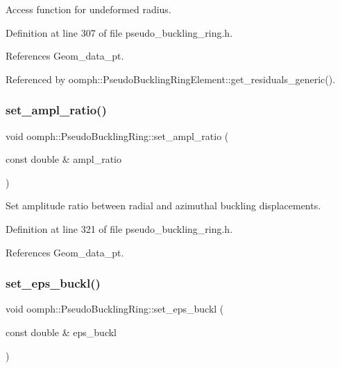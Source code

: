 Access function for undeformed radius. 



Definition at line 307 of file pseudo\+\_\+buckling\+\_\+ring.\+h.



References Geom\+\_\+data\+\_\+pt.



Referenced by oomph\+::\+Pseudo\+Buckling\+Ring\+Element\+::get\+\_\+residuals\+\_\+generic().

\mbox{\label{classoomph_1_1PseudoBucklingRing_a54c88bd59587d51f5d0083ec783a6797}} 
\subsubsection{\texorpdfstring{set\+\_\+ampl\+\_\+ratio()}{set\_ampl\_ratio()}}
{\footnotesize\ttfamily void oomph\+::\+Pseudo\+Buckling\+Ring\+::set\+\_\+ampl\+\_\+ratio (\begin{DoxyParamCaption}\item[{const double \&}]{ampl\+\_\+ratio }\end{DoxyParamCaption})\hspace{0.3cm}{\ttfamily [inline]}}



Set amplitude ratio between radial and azimuthal buckling displacements. 



Definition at line 321 of file pseudo\+\_\+buckling\+\_\+ring.\+h.



References Geom\+\_\+data\+\_\+pt.

\mbox{\label{classoomph_1_1PseudoBucklingRing_ad93efaf7bde42f34272ba668a5b71304}} 
\subsubsection{\texorpdfstring{set\+\_\+eps\+\_\+buckl()}{set\_eps\_buckl()}}
{\footnotesize\ttfamily void oomph\+::\+Pseudo\+Buckling\+Ring\+::set\+\_\+eps\+\_\+buckl (\begin{DoxyParamCaption}\item[{const double \&}]{eps\+\_\+buckl }\end{DoxyParamCaption})\hspace{0.3cm}{\ttfamily [inline]}}



